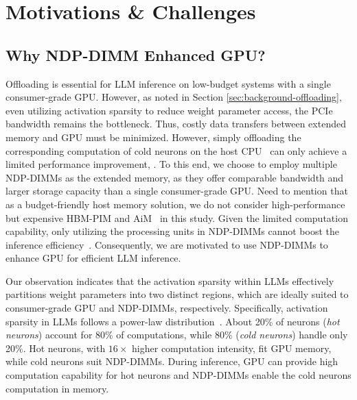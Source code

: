 \section{Motivations \& Challenges}

\subsection{Why NDP-DIMM Enhanced GPU?}


Offloading is essential for LLM inference on low-budget systems with a single consumer-grade GPU. However, as noted in Section \ref{sec:background-offloading}, even utilizing activation sparsity to reduce weight parameter access, the PCIe bandwidth remains the bottleneck. Thus, costly data transfers between extended memory and GPU must be minimized. However, simply offloading the corresponding computation of cold neurons on the host CPU~\cite{llama.cpp, song2023powerinfer} can only achieve a limited performance improvement, . To this end, we choose to employ multiple NDP-DIMMs as the extended memory, as they offer comparable bandwidth and larger storage capacity than a single consumer-grade GPU. Need to mention that as a budget-friendly host memory solution, we do not consider high-performance but expensive HBM-PIM and AiM~\cite{cong2017aim, park2024attacc} in this study. Given the limited computation capability, only utilizing the processing units in NDP-DIMMs cannot boost the inference efficiency~\cite{wu2024pim}. Consequently, we are motivated to use NDP-DIMMs to enhance GPU for efficient LLM inference.

Our observation indicates that the activation sparsity within LLMs effectively partitions weight parameters into two distinct regions, which are ideally suited to consumer-grade GPU and NDP-DIMMs, respectively. Specifically, activation sparsity in LLMs follows a power-law distribution~\cite{xue2024powerinfer, song2023powerinfer}. About 20\% of neurons (\textit{hot neurons}) account for 80\% of computations, while 80\% (\textit{cold neurons}) handle only 20\%. Hot neurons, with $16 \times$ higher computation intensity, fit GPU memory, while cold neurons suit NDP-DIMMs. During inference, GPU can provide high computation capability for hot neurons and NDP-DIMMs enable the cold neurons computation in memory.

